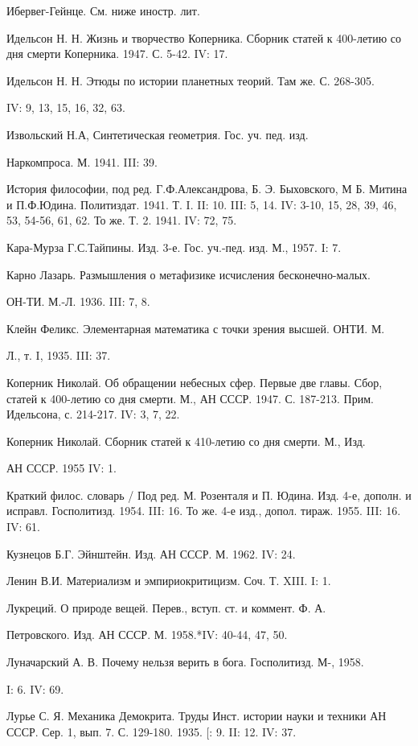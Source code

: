 Ибервег-Гейнце. См. ниже иностр. лит.

Идельсон Н. Н. Жизнь и творчество Коперника. Сборник статей к
400-летию со дня смерти Коперника. 1947. С. 5-42. IV: 17.

Идельсон Н. Н. Этюды по истории планетных теорий. Там же. С. 268-305.

IV: 9, 13, 15, 16, 32, 63.

Извольский Н.А, Синтетическая геометрия. Гос. уч. пед. изд.

Наркомпроса. М. 1941. III: 39.

История философии, под ред. Г.Ф.Александрова, Б. Э. Быховского, М Б.
Митина и П.Ф.Юдина. Политиздат. 1941. Т. I. II: 10. III: 5, 14. IV:
3-10, 15, 28, 39, 46, 53, 54-56, 61, 62. То же. Т. 2. 1941. IV: 72,
75.

Кара-Мурза Г.С.Тайпины. Изд. 3-е. Гос. уч.-пед. изд. М., 1957. I: 7.

Карно Лазарь. Размышления о метафизике исчисления бесконечно-малых.

ОН-ТИ. М.-Л. 1936. III: 7, 8.

Клейн Феликс. Элементарная математика с точки зрения высшей. ОНТИ. М.

Л., т. I, 1935. III: 37.

Коперник Николай. Об обращении небесных сфер. Первые две главы. Сбор,
статей к 400-летию со дня смерти. М., АН СССР. 1947. С. 187-213.
Прим. Идельсона, с. 214-217. IV: 3, 7, 22.

Коперник Николай. Сборник статей к 410-летию со дня смерти. М., Изд.

АН СССР. 1955 IV: 1.

Краткий филос. словарь / Под ред. М. Розенталя и П. Юдина. Изд. 4-е,
дополн. и исправл. Госполитизд. 1954. III: 16. То же. 4-е изд., допол.
тираж. 1955. III: 16. IV: 61.

Кузнецов Б.Г. Эйнштейн. Изд. АН СССР. М. 1962. IV: 24.

Ленин В.И. Материализм и эмпириокритицизм. Соч. Т. XIII. I: 1.

Лукреций. О природе вещей. Перев., вступ. ст. и коммент. Ф. А.

Петровского. Изд. АН СССР. М. 1958.*IV: 40-44, 47, 50.

Луначарский А. В. Почему нельзя верить в бога. Госполитизд. М-, 1958.

I: 6. IV: 69.

Лурье С. Я. Механика Демокрита. Труды Инст. истории науки и техники АН
СССР. Сер. 1, вып. 7. С. 129-180. 1935. [: 9. II: 12. IV: 37.

